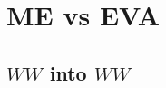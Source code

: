 \documentclass[a4paper,11pt]{article}
\begin{document}
\clearpage






\appendix

\section{ME vs EVA}

\subsection{$WW$ into $WW$}




\end{document}
